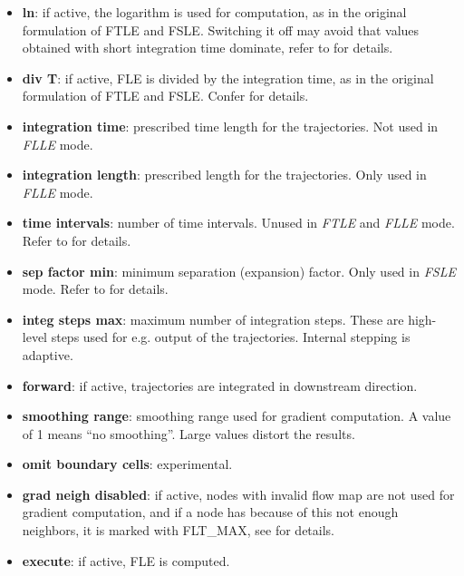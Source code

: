 \begin{itemize}
\item
  \textbf{ln}: if active, the logarithm is used for computation, as in the original formulation of FTLE and FSLE. Switching it off may avoid that values obtained with short integration time dominate, refer to \cite{Sadlo07ARidges} for details.

\item
  \textbf{div T}: if active, FLE is divided by the integration time, as in the original formulation of FTLE and FSLE. Confer \cite{Sadlo07ARidges} for details.

\item
  \textbf{integration time}: prescribed time length for the trajectories. Not used in \emph{FLLE} mode.

\item
  \textbf{integration length}: prescribed length for the trajectories. Only used in \emph{FLLE} mode.

\item
  \textbf{time intervals}: number of time intervals. Unused in \emph{FTLE} and \emph{FLLE} mode. Refer to \cite{Sadlo07ARidges} for details.

\item
  \textbf{sep factor min}: minimum separation (expansion) factor. Only used in \emph{FSLE} mode. Refer to \cite{Sadlo07ARidges} for details.

\item
  \textbf{integ steps max}: maximum number of integration steps. These are high-level steps used for e.g. output of the trajectories. Internal stepping is adaptive.

\item
  \textbf{forward}: if active, trajectories are integrated in downstream direction.

\item
  \textbf{smoothing range}: smoothing range used for gradient computation. A value of 1 means ``no smoothing''. Large values distort the results.

\item
  \textbf{omit boundary cells}: experimental.

\item
  \textbf{grad neigh disabled}: if active, nodes with invalid flow map are not used for gradient computation, and if a node has because of this not enough neighbors, it is marked with FLT\_MAX, see \cite{Sadlo07ARidges} for details.

\item
  \textbf{execute}: if active, FLE is computed.

\end{itemize}


